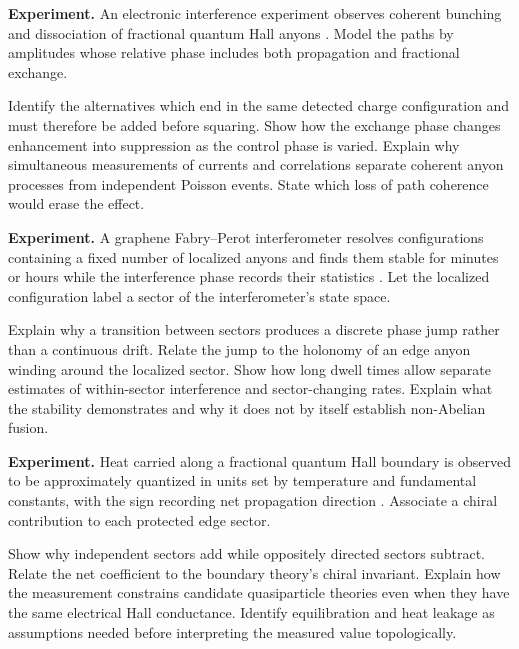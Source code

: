 \begin{exercise}
\textbf{Experiment.}
An electronic interference experiment observes coherent bunching and
dissociation of fractional quantum Hall anyons \cite{ghosh-bunching}.  Model
the paths by amplitudes whose relative phase includes both propagation and
fractional exchange.

Identify the alternatives which end in the same detected charge
configuration and must therefore be added before squaring.  Show how the
exchange phase changes enhancement into suppression as the control phase is
varied.  Explain why simultaneous measurements of currents and correlations
separate coherent anyon processes from independent Poisson events.  State
which loss of path coherence would erase the effect.
\end{exercise}

\begin{exercise}
\textbf{Experiment.}
A graphene Fabry--Perot interferometer resolves configurations containing a
fixed number of localized anyons and finds them stable for minutes or hours
while the interference phase records their statistics \cite{samuelson}.
Let the localized configuration label a sector of the interferometer's state
space.

Explain why a transition between sectors produces a discrete phase jump
rather than a continuous drift.  Relate the jump to the holonomy of an edge
anyon winding around the localized sector.  Show how long dwell times allow
separate estimates of within-sector interference and sector-changing rates.
Explain what the stability demonstrates and why it does not by itself
establish non-Abelian fusion.
\end{exercise}

\begin{exercise}
\textbf{Experiment.}
Heat carried along a fractional quantum Hall boundary is observed to be
approximately quantized in units set by temperature and fundamental
constants, with the sign recording net propagation direction
\cite{banerjee-heat}.
Associate a chiral contribution to each protected edge sector.

Show why independent sectors add while oppositely directed sectors subtract.
Relate the net coefficient to the boundary theory's chiral invariant.
Explain how the measurement constrains candidate quasiparticle theories even
when they have the same electrical Hall conductance.  Identify equilibration
and heat leakage as assumptions needed before interpreting the measured value
topologically.
\end{exercise}
